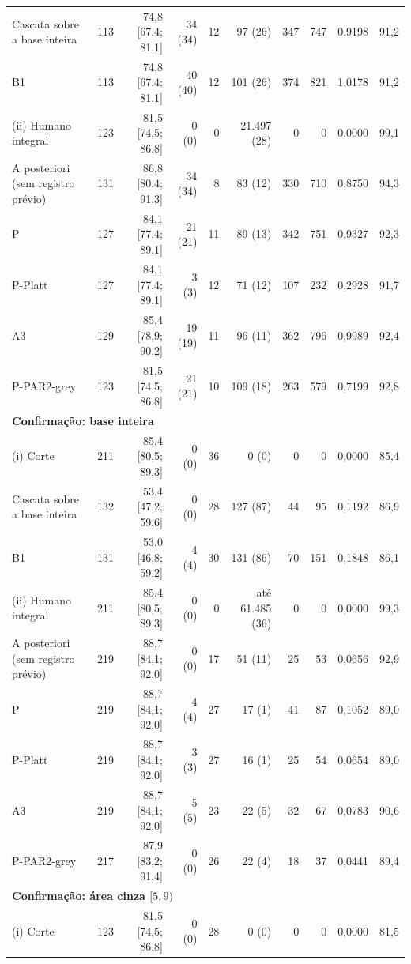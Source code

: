 \begin{longtable}{lrrrrrrrrr}
Cascata sobre a base inteira & 113 & 74,8 [67,4; 81,1] & 34 (34) & 12 & 97 (26) & 347 & 747 & 0,9198 & 91,2 \\
B1 & 113 & 74,8 [67,4; 81,1] & 40 (40) & 12 & 101 (26) & 374 & 821 & 1,0178 & 91,2 \\
(ii) Humano integral & 123 & 81,5 [74,5; 86,8] & 0 (0) & 0 & 21.497 (28) & 0 & 0 & 0,0000 & 99,1 \\
A posteriori (sem registro prévio) & 131 & 86,8 [80,4; 91,3] & 34 (34) & 8 & 83 (12) & 330 & 710 & 0,8750 & 94,3 \\
P & 127 & 84,1 [77,4; 89,1] & 21 (21) & 11 & 89 (13) & 342 & 751 & 0,9327 & 92,3 \\
P-Platt & 127 & 84,1 [77,4; 89,1] & 3 (3) & 12 & 71 (12) & 107 & 232 & 0,2928 & 91,7 \\
A3 & 129 & 85,4 [78,9; 90,2] & 19 (19) & 11 & 96 (11) & 362 & 796 & 0,9989 & 92,4 \\
P-PAR2-grey & 123 & 81,5 [74,5; 86,8] & 21 (21) & 10 & 109 (18) & 263 & 579 & 0,7199 & 92,8 \\
\midrule
\multicolumn{10}{l}{\textbf{Confirmação: base inteira}} \\
(i) Corte & 211 & 85,4 [80,5; 89,3] & 0 (0) & 36 & 0 (0) & 0 & 0 & 0,0000 & 85,4 \\
Cascata sobre a base inteira & 132 & 53,4 [47,2; 59,6] & 0 (0) & 28 & 127 (87) & 44 & 95 & 0,1192 & 86,9 \\
B1 & 131 & 53,0 [46,8; 59,2] & 4 (4) & 30 & 131 (86) & 70 & 151 & 0,1848 & 86,1 \\
(ii) Humano integral & 211 & 85,4 [80,5; 89,3] & 0 (0) & 0 & até 61.485 (36) & 0 & 0 & 0,0000 & 99,3 \\
A posteriori (sem registro prévio) & 219 & 88,7 [84,1; 92,0] & 0 (0) & 17 & 51 (11) & 25 & 53 & 0,0656 & 92,9 \\
P & 219 & 88,7 [84,1; 92,0] & 4 (4) & 27 & 17 (1) & 41 & 87 & 0,1052 & 89,0 \\
P-Platt & 219 & 88,7 [84,1; 92,0] & 3 (3) & 27 & 16 (1) & 25 & 54 & 0,0654 & 89,0 \\
A3 & 219 & 88,7 [84,1; 92,0] & 5 (5) & 23 & 22 (5) & 32 & 67 & 0,0783 & 90,6 \\
P-PAR2-grey & 217 & 87,9 [83,2; 91,4] & 0 (0) & 26 & 22 (4) & 18 & 37 & 0,0441 & 89,4 \\
\midrule
\multicolumn{10}{l}{\textbf{Confirmação: área cinza $[5,9)$}} \\
(i) Corte & 123 & 81,5 [74,5; 86,8] & 0 (0) & 28 & 0 (0) & 0 & 0 & 0,0000 & 81,5 \\

\end{longtable}
